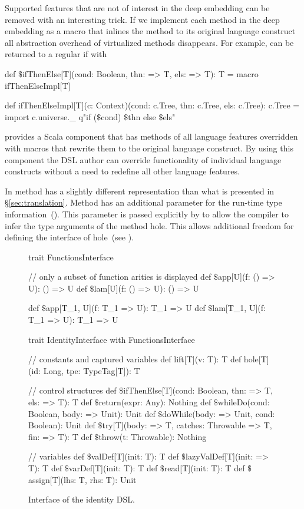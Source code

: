 Supported features that are not of interest in the deep embedding
 can be removed with an interesting trick. If we implement each method in the deep embedding as a macro
 that inlines the method to its original language construct all abstraction overhead of virtualized methods
 disappears. For example,  can be returned to a regular if with\begin{lstparagraph}
def $\$$ifThenElse[T](cond: Boolean, thn: => T, els: => T): T =
  macro ifThenElseImpl[T]

def ifThenElseImpl[T](c: Context)(cond: c.Tree,
  thn: c.Tree, els: c.Tree): c.Tree = { import c.universe._
  q"if ($\$$cond) $\$$thn else $\$$els"
}
\end{lstparagraph}

\yy provides a Scala component that has methods of all language features overridden with macros that rewrite
 them to the original language construct. By using this component the DSL author can override functionality
of individual language constructs without a need to redefine all other language features.

In  method  has a slightly different  representation than what is presented in \S \ref{sec:translation}. Method 
 has an additional parameter for the run-time type information~().
 This parameter is passed explicitly by \yy to allow the compiler to infer the type arguments
 of the method hole. This allows additional freedom for defining the interface of hole~(see ).


\begin{figure}
\begin{listingtiny}
trait FunctionsInterface {
  // only a subset of function arities is displayed
  def $\$$app[U](f: () => U): () => U
  def $\$$lam[U](f: () => U): () => U

  def $\$$app[T_1, U](f: T_1 => U): T_1 => U
  def $\$$lam[T_1, U](f: T_1 => U): T_1 => U
}

trait IdentityInterface with FunctionsInterface {
  // constants and captured variables
  def lift[T](v: T): T
  def hole[T](id: Long, tpe: TypeTag[T]): T

  // control structures
  def $\$$ifThenElse[T](cond: Boolean, thn: => T, els: => T): T
  def $\$$return(expr: Any): Nothing
  def $\$$whileDo(cond: Boolean, body: => Unit): Unit
  def $\$$doWhile(body: => Unit, cond: Boolean): Unit
  def $\$$try[T](body: => T, catches: Throwable => T, fin: => T): T
  def $\$$throw(t: Throwable): Nothing

  // variables
  def $\$$valDef[T](init: T): T
  def $\$$lazyValDef[T](init: => T): T
  def $\$$varDef[T](init: T): T
  def $\$$read[T](init: T): T
  def $\$$assign[T](lhs: T, rhs: T): Unit
}
\end{listingtiny}
\caption{Interface of the identity DSL.}
\label{fig:interface-identity-dsl}
\end{figure}



